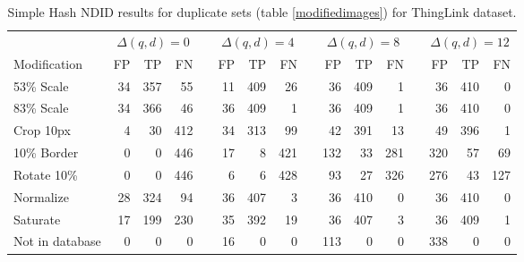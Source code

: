 \documentclass[english,12pt,a4paper,pdftex,elec,utf8, table]{aaltothesis}
\begin{document}
\begin{table}[htb]\footnotesize
\caption{ Simple Hash NDID results for duplicate sets (table \ref{modifiedimages}) for ThingLink dataset. }
\label{simplethinglinkresults}
\begin{center}
  \setlength\tabcolsep{3pt} %
  \begin{tabular}{@{}lrrrrrrrrrrrrrrr@{}}
    \toprule
    & \multicolumn{3}{c}{$\Delta(q,d) = 0$} &\phantom{abc} &\multicolumn{3}{c}{$\Delta(q,d) = 4$} &\phantom{abc} & \multicolumn{3}{c}{$\Delta(q,d)=8$} &\phantom{abc} & \multicolumn{3}{c}{$\Delta(q,d)=12$}\\
\cmidrule{2-4} \cmidrule{6-8} \cmidrule{10-12} \cmidrule{14-16}
    Modification & FP & TP & FN &\phantom{abc} & FP & TP & FN &\phantom{abc} & FP & TP & FN &\phantom{abc} & FP & TP & FN\\ \midrule
    53\% Scale   & 34 & 357 & 55 &\phantom{abc} & 11 & 409 & 26 &\phantom{abc} & 36 & 409 & 1 &\phantom{abc} & 36 & 410 & 0\\
    83\% Scale   & 34 & 366 & 46 &\phantom{abc} & 36 & 409 & 1 &\phantom{abc} & 36 & 409 & 1 &\phantom{abc} & 36 & 410 & 0\\
    Crop 10px    & 4 & 30 & 412 &\phantom{abc} & 34 & 313 & 99 &\phantom{abc} & 42 & 391 & 13 &\phantom{abc} & 49 & 396 & 1\\
    10\% Border  & 0 & 0 & 446 & \phantom{abc} & 17 & 8 & 421 &\phantom{abc} & 132 & 33 & 281 &\phantom{abc} & 320 & 57 & 69\\
    Rotate 10\%  & 0 & 0 & 446 &\phantom{abc} & 6 & 6 & 428 &\phantom{abc} & 93 & 27 & 326 &\phantom{abc} & 276 & 43 & 127\\
    Normalize    & 28 & 324 & 94 &\phantom{abc} & 36 & 407 & 3 &\phantom{abc} & 36 & 410 & 0 &\phantom{abc} & 36 & 410 & 0\\
    Saturate     & 17 & 199 & 230 &\phantom{abc} & 35 & 392 & 19 &\phantom{abc} & 36 & 407 & 3 &\phantom{abc} & 36 & 409 & 1\\
    Not in database     & 0& 0& 0 &\phantom{abc} & 16 & 0 & 0 &\phantom{abc} &113 & 0 & 0 &\phantom{abc} & 338 & 0 & 0\\
\bottomrule
\end{tabular}
\end{center}
\end{table}
\end{document}
